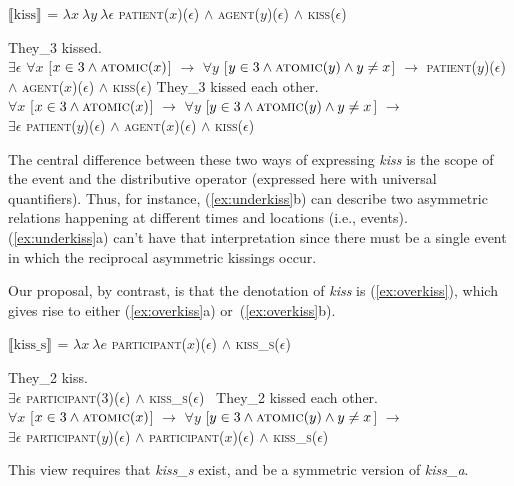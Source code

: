 \documentclass[twoside, 12pt]{article}
\newcommand{\denotes}[2][]{\ensuremath{\llbracket \text{#2}\rrbracket^{#1}}}
\begin{document}
\begin{exe}
\raggedright
  \ex \label{ex:underkiss} \denotes{kiss} = $\lambda x\ \lambda y\ \lambda \epsilon$ \textsc{patient}($x$)($\epsilon$) $\wedge$ \textsc{agent}($y$)($\epsilon$) $\wedge$ \textsc{kiss}($\epsilon$)
  \begin{xlist}
    \ex They_3 kissed.\\ $\exists \epsilon$ $\forall x$ [$x \in 3 \wedge \textsc{atomic}(x)$] $\rightarrow$ $\forall y$ [$y \in 3 \wedge \textsc{atomic}(y) \wedge y \neq x$] $\rightarrow$  \textsc{patient}($y$)($\epsilon$) $\wedge$ \textsc{agent}($x$)($\epsilon$) $\wedge$ \textsc{kiss}($\epsilon$)
    \ex They_3 kissed each other.\\ $\forall x$ [$x \in 3 \wedge \textsc{atomic}(x)$] $\rightarrow$ $\forall y$ [$y \in 3 \wedge \textsc{atomic}(y) \wedge y \neq x$] $\rightarrow$\\  $\exists \epsilon$ \textsc{patient}($y$)($\epsilon$) $\wedge$ \textsc{agent}($x$)($\epsilon$) $\wedge$ \textsc{kiss}($\epsilon$)
  \end{xlist}
\end{exe}
The central difference between these two ways of expressing \textit{kiss} is the scope of the event and the distributive operator (expressed here with universal quantifiers). Thus, for instance, (\ref{ex:underkiss}b) can describe two asymmetric relations happening at different times and locations (i.e., events). (\ref{ex:underkiss}a) can't have that interpretation since there must be a single event in which the reciprocal asymmetric kissings occur.

Our proposal, by contrast, is that the denotation of \textit{kiss} is (\ref{ex:overkiss}), which gives rise to either (\ref{ex:overkiss}a) or~(\ref{ex:overkiss}b).
\begin{exe}
\raggedright
  \ex \label{ex:overkiss} \denotes{kiss_s} = $\lambda x\ \lambda e$ \textsc{participant}($x$)($\epsilon$) $\wedge$ \textsc{kiss_s}($\epsilon$)
  \begin{xlist}
    \ex They_2 kiss.\\ $\exists \epsilon$ \textsc{participant}($3$)($\epsilon$) $\wedge$ \textsc{kiss_s}($\epsilon$)
    \
    \ex They_2 kissed each other.\\ $\forall x$ [$x \in 3 \wedge \textsc{atomic}(x)$] $\rightarrow$ $\forall y$ [$y \in 3 \wedge \textsc{atomic}(y) \wedge y \neq x$] $\rightarrow$\\  $\exists \epsilon$ \textsc{participant}($y$)($\epsilon$) $\wedge$ \textsc{participant}($x$)($\epsilon$) $\wedge$ \textsc{kiss_s}($\epsilon$)
  \end{xlist}
\end{exe}
This view requires that \textit{kiss_s} exist, and be a symmetric version of \textit{kiss_a}. 
\end{document}
